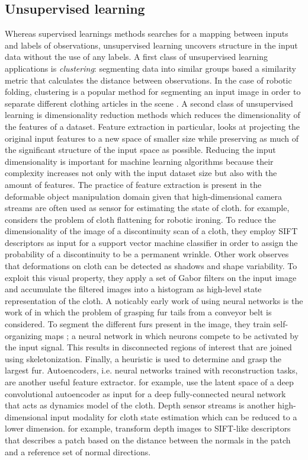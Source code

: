 \documentclass[\home/main.tex]{subfiles}
\begin{document}
\subsection{Unsupervised learning}
Whereas supervised learnings methods searches for a mapping between inputs and labels of observations, unsupervised learning uncovers structure in the input data without the use of any labels. A first class of unsupervised learning applications is \emph{clustering}: segmenting data into similar groups based a similarity metric that calculates the distance between observations. In the case of robotic folding, clustering is a popular method for segmenting an input image in order to separate different clothing articles in the scene \autocite{Doumanoglou2016,Maitin2010,Jia2018}. A second class of unsupervised learning is dimensionality reduction methods which reduces the dimensionality of the features of a dataset. Feature extraction in particular, looks at projecting the original input features to a new space of smaller size while preserving as much of the significant structure of the input space as possible. Reducing the input dimensionality is important for machine learning algorithms because their complexity increases not only with the input dataset size but also with the amount of features. 
The practice of feature extraction is present in the deformable object manipulation domain given that high-dimensional camera streams are often used as sensor for estimating the state of cloth. \textcite{li2016multi} for example, considers the problem of cloth flattening for robotic ironing. To reduce the dimensionality of the image of a discontinuity scan of a cloth, they employ SIFT descriptors \autocite{lowe1999object} as input for a support vector machine classifier in order to assign the probability of a discontinuity to be a permanent wrinkle. Other work \autocite{Jia2018} observes that deformations on cloth can be detected as shadows and shape variability. To exploit this visual property, they apply a set of Gabor filters on the input image and accumulate the filtered images into a histogram as high-level state representation of the cloth.
A noticably early work of using neural networks is the work of \textcite{Foresti2004} in which the problem of grasping fur tails from a conveyor belt is considered. To segment the different furs present in the image, they train self-organizing maps \autocite{Kohonen1982}; a neural network in which neurons compete to be activated by the input signal. This results in disconnected regions of interest that are joined using skeletonization. Finally, a heuristic is used to determine and grasp the largest fur.
Autoencoders, i.e. neural networks trained with reconstruction tasks, are another useful feature extractor. \textcite{Yang2017} for example, use the latent space of a deep convolutional autoencoder as input for a deep fully-connected neural network that acts as dynamics model of the cloth. Depth sensor streams is another high-dimensional input modality for cloth state estimation which can be reduced to a lower dimension. \textcite{Ramisa2013} for example, transform depth images to SIFT-like descriptors that describes a patch based on the distance between the normals in the patch and a reference set of normal directions.
\end{document}
